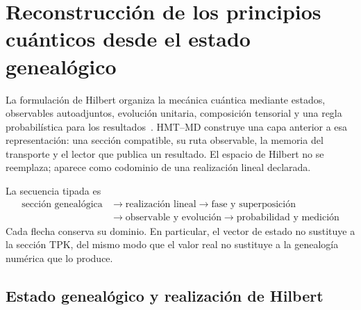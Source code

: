 \section{Reconstrucción de los principios cuánticos desde el estado genealógico}
\label{v:v:rec:sec:postulados-cuanticos-genealogicos-rev2}

La formulación de Hilbert organiza la mecánica cuántica mediante estados,
observables autoadjuntos, evolución unitaria, composición tensorial y una
regla probabilística para los resultados~\cite{v:vonNeumann1932}. HMT--MD
construye una capa anterior a esa representación: una sección compatible,
su ruta observable, la memoria del transporte y el lector que publica un
resultado. El espacio de Hilbert no se reemplaza; aparece como codominio de
una realización lineal declarada.

La secuencia tipada es
\[
 \boxed{\begin{aligned}
 \text{sección genealógica}
 &\longrightarrow \text{realización lineal}
 \longrightarrow \text{fase y superposición}\\
 &\longrightarrow \text{observable y evolución}
 \longrightarrow \text{probabilidad y medición}
 \end{aligned}}
\]
Cada flecha conserva su dominio. En particular, el vector de estado no
sustituye a la sección TPK, del mismo modo que el valor real no sustituye a
la genealogía numérica que lo produce.

\subsection{Estado genealógico y realización de Hilbert}
\label{v:v:rec:realizacion_evolucion:section:02}

